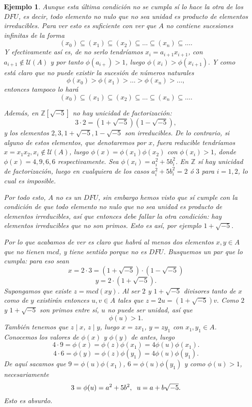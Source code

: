 \documentclass[12pt]{article}
\newtheorem{example}{Ejemplo}[theorem]
\begin{document}
\begin{example}
Aunque esta última condición no se cumpla sí lo hace la otra de los $DFU$, es decir, todo elemento no nulo que no sea unidad es producto de elementos irreducibles. Para ver esto es suficiente con ver que $A$ no contiene sucesiones infinitas de la forma $$(x_{0}) \subseteq (x_{1}) \subseteq (x_{2}) \subseteq \ldots \subseteq (x_{n}) \subseteq \ldots.$$ Y efectivamente así es, de no serlo tendríamos $x_{i} = a_{i+1}x_{i+1}$, con $a_{i+1} \notin  \mathcal{U}(A)$ y por tanto $\phi (a_{i+}) > 1$, luego $\phi (x_{i}) > \phi (x_{i+1}).$ Y como está claro que no puede existir la sucesión de números naturales $$\phi(x_{0}) > \phi (x_{1}) > \ldots > \phi(x_{n}) > \ldots, $$ entonces tampoco lo hará $$(x_{0}) \subseteq (x_{1}) \subseteq (x_{2}) \subseteq \ldots \subseteq (x_{n}) \subseteq \ldots.$$ 

Además, en $\mathbb{Z}[\sqrt{-5}]$ no hay unicidad de factorización: $$3 \cdot 2 = (1 + \sqrt{-5}) (1- \sqrt{-5}),$$ y los elementos $2,3, 1+ \sqrt{-5}, 1 - \sqrt{-5}$ son irreducibles. De lo contrario, si alguno de estos elementos, que denotaremos por $x$, fuera reducible tendríamos $x = x_{1}x_{2},  x_{i} \notin \mathcal{U}(A)$, luego $\phi(x) = \phi(x_{1}) \phi(x_{2})$ con $\phi(x_{i}) >1$, donde $\phi(x) = 4,9,6,6$ respectivamente. Sea $\phi(x_{i}) = a_{i}^{2} + 5b_{i}^{2}$. En $\mathbb{Z}$ sí hay unicidad de factorización, luego en cualquiera de los casos $a_{i}^{2}+5b_{i}^{2} = 2$ ó $3$ para $i = 1,2$, lo cual es imposible.

Por todo esto, $A$ no es un $DFU$, sin embargo hemos visto que sí cumple con la condición de que todo elemento no nulo que no sea unidad es producto de elementos irreducibles, así que entonces debe fallar la otra condición: hay elementos irreducibles que no son primos. Esto es así, por ejemplo $1+\sqrt{-5}$.

Por lo que acabamos de ver es claro que habrá al menos dos elementos $x,y \in A$ que no tienen $mcd$, y tiene sentido porque no es $DFU$. Busquemos un par que lo cumpla: para eso sean $$x = 2 \cdot 3 = (1 + \sqrt{-5})\cdot(1- \sqrt{-5})$$ $$y = 2 \cdot (1 + \sqrt{-5}).$$ Supongamos que existe $z = mcd(xy)$. Al ser $2$ y $1 + \sqrt{-5}$ divisores tanto de $x$ como de $y$ existirán entonces $u,v \in A$ tales que $z = 2u = (1 + \sqrt{-5})v.$ Como $2$ y $1+ \sqrt{-5}$ son primos entre sí, $u$ no puede ser unidad, así que $$\phi(u) > 1.$$ También tenemos que $z \mid x$, $z \mid y$, luego $x = zx_{1}$, $y = zy_{1}$ con $x_{1}, y_{1} \in A$. Conocemos los valores de $\phi(x)$ y $\phi(y)$ de antes, luego $$4 \cdot 9 = \phi(x) = \phi(z) \phi (x_{1}) = 4\phi(u) \phi(x_{1}).$$ $$4 \cdot 6 = \phi(y) = \phi(z) \phi(y_{1}) = 4 \phi(u) \phi(y_{1}).$$ De aquí sacamos que $9 = \phi(u) \phi(x_{1})$, $ 6 = \phi(u) \phi(y_{1})$ y como $\phi(u) >1$, necesariamente $$3 = \phi(u) = a^{2} + 5b^{2}, \hspace{0.2cm} u = a+b\sqrt{-5}.$$ Esto es absurdo.


\end{example}
\end{document}
